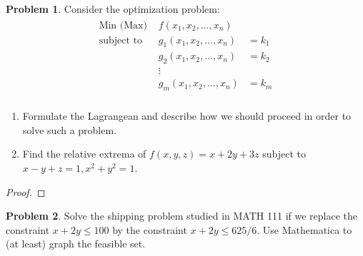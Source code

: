 \documentclass[12pt]{article}
\theoremstyle{definition}
\newtheorem{problem}{Problem}
\begin{document}
\begin{problem}
  Consider the optimization problem:
  \begin{align*}
    \begin{array} {lcl}
      \text{Min (Max) } & f(x_1, x_2, \dots, x_n) & \\
      \text{subject to } & g_1(x_1, x_2, \dots, x_n) &= k_1 \\
      & g_2(x_1, x_2, \dots, x_n) &= k_2 \\
      & \vdots & \\
      & g_m(x_1, x_2, \dots, x_n) &= k_m \\
    \end{array}
  \end{align*}
  \begin{enumerate}
    \item Formulate the Lagrangean and describe how we should proceed in order
      to solve such a problem.
    \item Find the relative extrema of $f(x, y, z) = x + 2y + 3z$ subject to
      $x - y + z = 1, x^2 + y^2 = 1$.
  \end{enumerate}
\end{problem}

\begin{proof}
\end{proof}
\newpage


\begin{problem}
  Solve the shipping problem studied in MATH 111 if we replace the constraint
  $x + 2y \leq 100$ by the constraint $x + 2y \leq 625/6$. Use Mathematica to
  (at least) graph the feasible set.
\end{problem}
\end{document}
